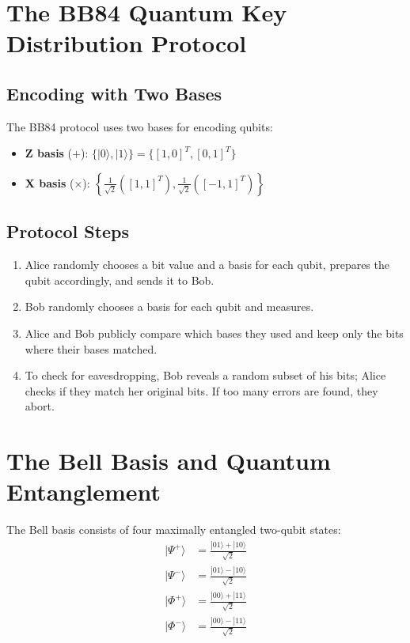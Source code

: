 \documentclass{book}
\begin{document}
\section{The BB84 Quantum Key Distribution Protocol}

\subsection{Encoding with Two Bases}
The BB84 protocol uses two bases for encoding qubits:
\begin{itemize}
    \item \textbf{Z basis} ($+$): $\{|0\rangle, |1\rangle\} = \{[1,0]^T, [0,1]^T\}$
    \item \textbf{X basis} ($\times$): $\left\{\frac{1}{\sqrt{2}}([1,1]^T), \frac{1}{\sqrt{2}}([-1,1]^T)\right\}$
\end{itemize}

\subsection{Protocol Steps}
\begin{enumerate}
    \item Alice randomly chooses a bit value and a basis for each qubit, prepares the qubit accordingly, and sends it to Bob.
    \item Bob randomly chooses a basis for each qubit and measures.
    \item Alice and Bob publicly compare which bases they used and keep only the bits where their bases matched.
    \item To check for eavesdropping, Bob reveals a random subset of his bits; Alice checks if they match her original bits. If too many errors are found, they abort.
\end{enumerate}

\section{The Bell Basis and Quantum Entanglement}
The Bell basis consists of four maximally entangled two-qubit states:
\begin{align*}
|\Psi^+\rangle &= \frac{|01\rangle + |10\rangle}{\sqrt{2}} \\
|\Psi^-\rangle &= \frac{|01\rangle - |10\rangle}{\sqrt{2}} \\
|\Phi^+\rangle &= \frac{|00\rangle + |11\rangle}{\sqrt{2}} \\
|\Phi^-\rangle &= \frac{|00\rangle - |11\rangle}{\sqrt{2}}
\end{align*}
\end{document}
